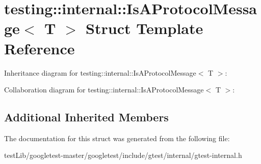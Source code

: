 \hypertarget{structtesting_1_1internal_1_1IsAProtocolMessage}{}\section{testing\+:\+:internal\+:\+:Is\+A\+Protocol\+Message$<$ T $>$ Struct Template Reference}
\label{structtesting_1_1internal_1_1IsAProtocolMessage}


Inheritance diagram for testing\+:\+:internal\+:\+:Is\+A\+Protocol\+Message$<$ T $>$\+:


Collaboration diagram for testing\+:\+:internal\+:\+:Is\+A\+Protocol\+Message$<$ T $>$\+:
\subsection*{Additional Inherited Members}


The documentation for this struct was generated from the following file\+:\begin{DoxyCompactItemize}
\item 
test\+Lib/googletest-\/master/googletest/include/gtest/internal/gtest-\/internal.\+h\end{DoxyCompactItemize}
